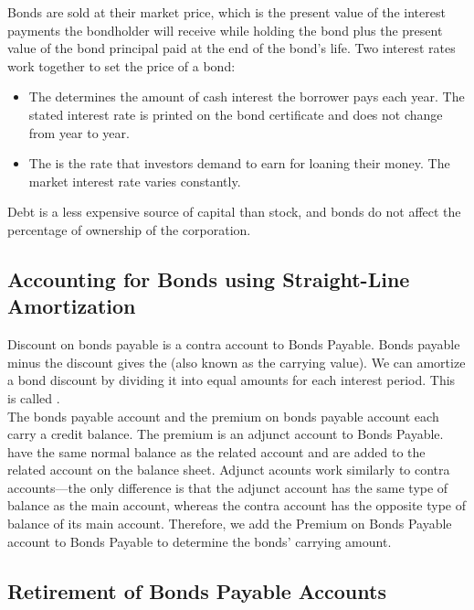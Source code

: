 \documentclass{article}
\begin{document}
Bonds are sold at their market price, which is the present value of the interest payments the bondholder will receive while holding the bond plus the present value of the bond principal paid at the end of the bond's life. Two interest rates work together to set the price of a bond: 
\begin{itemize}
  \item The  determines the amount of cash interest the borrower pays each year. The stated interest rate is printed on the bond certificate and does not change from year to year. 
  \item The  is the rate that investors demand to earn for loaning their money. The market interest rate varies constantly. 
\end{itemize}

Debt is a less expensive source of capital than stock, and bonds do not affect the percentage of ownership of the corporation. 

\subsection{Accounting for Bonds using Straight-Line Amortization}

Discount on bonds payable is a contra account to Bonds Payable. Bonds payable minus the discount gives the  (also known as the carrying value). We can amortize a bond discount by dividing it into equal amounts for each interest period. This is called . \\ 

The bonds payable account and the premium on bonds payable account each carry a credit balance. The premium is an adjunct account to Bonds Payable.  have the same normal balance as the related account and are added to the related account on the balance sheet. Adjunct acounts work similarly to contra accounts---the only difference is that the adjunct account has the same type of balance as the main account, whereas the contra account has the opposite type of balance of its main account. Therefore, we add the Premium on Bonds Payable account to Bonds Payable to determine the bonds' carrying amount. 

\subsection{Retirement of Bonds Payable Accounts}
\end{document}
